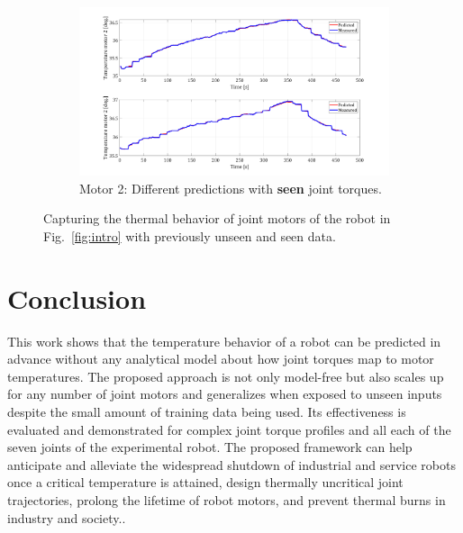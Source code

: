 \documentclass{ifacconf}
\begin{document}
\begin{figure}[t!]
\begin{subfigure}[t]{\columnwidth}
	\includegraphics[height=2.in]{./pictures/applications/J2.png}
	\caption{Motor 2: Different predictions with \textbf{seen} joint torques.}
\end{subfigure}
	\caption{Capturing the thermal behavior of joint motors of the robot in Fig.~\ref{fig:intro} with previously unseen and seen data.}
	\label{sevenjoint}
\end{figure}

\section{Conclusion}
This work shows that the temperature behavior of a robot can be predicted in advance without any analytical  model about how joint torques map to motor temperatures. The proposed approach is not only model-free but also scales up for any number of joint motors and generalizes when exposed to  unseen inputs despite the small amount of training data being used. Its effectiveness is evaluated and demonstrated for complex joint torque profiles and all each of the seven joints of the experimental robot. The proposed framework can help anticipate and alleviate the widespread shutdown  of industrial and service robots once a critical temperature  is attained, design thermally uncritical joint trajectories, prolong the lifetime of robot motors, and prevent thermal burns in industry and society..


                                                   

\end{document}
